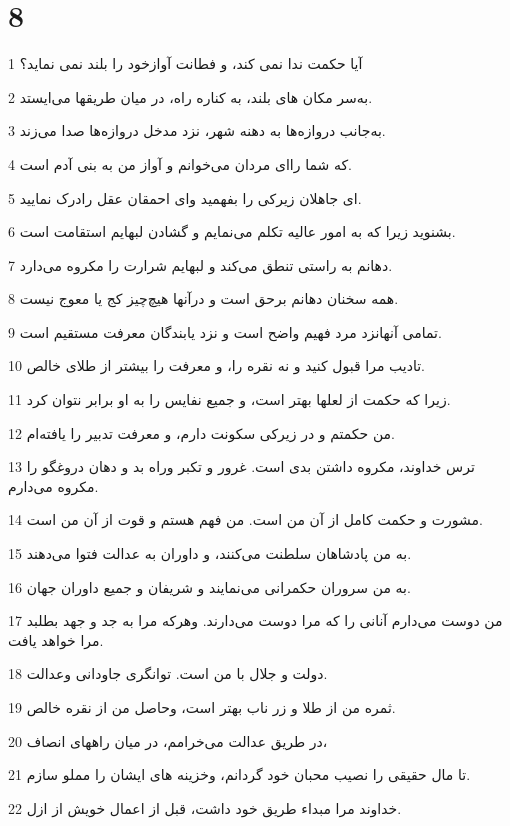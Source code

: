 \chapter{8}

\par 1 آیا حکمت ندا نمی کند، و فطانت آوازخود را بلند نمی نماید؟
\par 2 به‌سر مکان های بلند، به کناره راه، در میان طریقها می‌ایستد.
\par 3 به‌جانب دروازه‌ها به دهنه شهر، نزد مدخل دروازه‌ها صدا می‌زند.
\par 4 که شما را‌ای مردان می‌خوانم و آواز من به بنی آدم است.
\par 5 ‌ای جاهلان زیرکی را بفهمید و‌ای احمقان عقل رادرک نمایید.
\par 6 بشنوید زیرا که به امور عالیه تکلم می‌نمایم و گشادن لبهایم استقامت است.
\par 7 دهانم به راستی تنطق می‌کند و لبهایم شرارت را مکروه می‌دارد.
\par 8 همه سخنان دهانم بر‌حق است و درآنها هیچ‌چیز کج یا معوج نیست.
\par 9 تمامی آنهانزد مرد فهیم واضح است و نزد یابندگان معرفت مستقیم است.
\par 10 تادیب مرا قبول کنید و نه نقره را، و معرفت را بیشتر از طلای خالص.
\par 11 زیرا که حکمت از لعلها بهتر است، و جمیع نفایس را به او برابر نتوان کرد.
\par 12 من حکمتم و در زیرکی سکونت دارم، و معرفت تدبیر را یافته‌ام.
\par 13 ترس خداوند، مکروه داشتن بدی است. غرور و تکبر وراه بد و دهان دروغگو را مکروه می‌دارم.
\par 14 مشورت و حکمت کامل از آن من است. من فهم هستم و قوت از آن من است.
\par 15 به من پادشاهان سلطنت می‌کنند، و داوران به عدالت فتوا می‌دهند.
\par 16 به من سروران حکمرانی می‌نمایند و شریفان و جمیع داوران جهان.
\par 17 من دوست می‌دارم آنانی را که مرا دوست می‌دارند. وهر‌که مرا به جد و جهد بطلبد مرا خواهد یافت.
\par 18 دولت و جلال با من است. توانگری جاودانی وعدالت.
\par 19 ثمره من از طلا و زر ناب بهتر است، وحاصل من از نقره خالص.
\par 20 در طریق عدالت می‌خرامم، در میان راههای انصاف،
\par 21 تا مال حقیقی را نصیب محبان خود گردانم، وخزینه های ایشان را مملو سازم.
\par 22 خداوند مرا مبداء طریق خود داشت، قبل از اعمال خویش از ازل.
